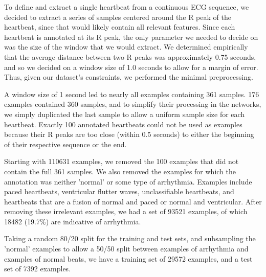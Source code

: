 \documentclass{article} %
\begin{document}
To define and extract a single heartbeat from a continuous ECG sequence, we decided to extract a series of samples centered around the R peak of the heartbeat, since that would likely contain all relevant features. Since each heartbeat is annotated at its R peak, the only parameter we needed to decide on was the size of the window that we would extract. We determined empirically that the average distance between two R peaks was approximately 0.75 seconds, and so we decided on a window size of 1.0 seconds to allow for a margin of error. Thus, given our dataset's constraints, we performed the minimal preprocessing.

A window size of 1 second led to nearly all examples containing 361 samples. 176 examples contained 360 samples, and to simplify their processing in the  networks, we simply duplicated the last sample to allow a uniform sample size for each heartbeat. Exactly 100 annotated heartbeats could not be used as examples because their R peaks are too close (within 0.5 seconds) to either the beginning of their respective sequence or the end.

Starting with 110631 examples, we removed the 100 examples that did not contain the full 361 samples. We also removed the examples for which the annotation was neither 'normal' or some type of arrhythmia. Examples include paced heartbeats, ventricular flutter waves, unclassifiable heartbeats, and heartbeats that are a fusion of normal and paced or normal and ventricular. After removing these irrelevant examples, we had a set of 93521 examples, of which 18482 (19.7\%) are indicative of arrhythmia.

Taking a random 80/20 split for the training and test sets, and subsampling the 'normal' examples to allow a 50/50 split between examples of arrhythmia and examples of normal beats, we have a training set of 29572 examples, and a test set of 7392 examples.
\end{document}
